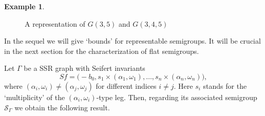 \documentclass[oneside]{amsart}
\numberwithin{equation}{section}
\numberwithin{equation}{subsection}
\theoremstyle{plain}
\theoremstyle{definition}
\newtheorem{example}[equation]{Example}
\newcommand{\calS}{{\mathcal S}}\newcommand{\cals}{{\bf s}}\newcommand{\calst}{{\bf st}}\newcommand{\cS}{{\mathcal S}}
\newcommand{\w}{\omega}
\newcommand{\al}{\alpha}
\newcommand{\G}{\Gamma}
\begin{document}
\begin{example}
\begin{figure}[h!]
\begin{center}
\begin{minipage}{5cm}
\end{minipage}
\end{center}
\caption{A representation of $G(3,5)$ and $G(3,4,5)$}
\label{fig:1}
\end{figure}
\end{example}



In the sequel we will give `bounds' for representable semigroups. It will be crucial in the next section for the characterization of flat semigroups.

   Let $\G$ be a SSR graph with Seifert invariants 
  \begin{equation}
    \label{eq:sf_multiple}
    Sf=\big(-b_0,s_1\times(\al_1,\w_1),\dots,s_n\times(\al_n,\w_n)
    \big), 
  \end{equation}
   where $(\al_i,\w_i)\neq(\al_j,\w_j)$  for different indices $i\neq j$. Here $s_i$ stands for the `multiplicity' of the $(\al_i,\w_i)$-type leg. Then, regarding its associated semigroup $\calS_{\Gamma}$ we obtain the following result.
\end{document}
